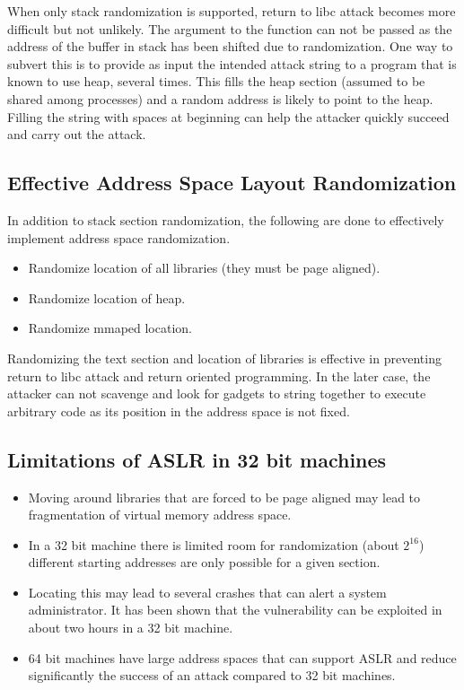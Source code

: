 \documentclass[11pt]{article} %
\begin{document}
When only stack randomization is supported, return to libc attack becomes more
difficult but not unlikely. The argument to the function can not be passed as
the address of the buffer in stack has been shifted due to randomization. One
way to subvert this is to provide as input the intended attack string to a
program that is known to use heap, several times. This fills the heap section
(assumed to be shared among processes) and a random address is likely to point
 to the heap. Filling the string with spaces at beginning can help the attacker
quickly succeed and carry out the attack.

\subsection {Effective Address Space Layout Randomization}
In addition to stack section randomization, the following are done to effectively
implement address space randomization.

\begin {itemize} \itemsep -2pt
\item Randomize location of all libraries (they must be page aligned).
\item Randomize location of heap.
\item Randomize mmaped location.
\end {itemize}

Randomizing the text section and location of libraries is effective in preventing
return to libc attack and return oriented programming. In the later case, the
attacker can not scavenge and look for gadgets to string together to execute
arbitrary code as its position in the address space is not fixed.

\subsection {Limitations of ASLR in 32 bit machines}
\begin {itemize} \itemsep -2pt
\item Moving around libraries that are forced to be page aligned may lead to
fragmentation of virtual memory address space.
\item In a 32 bit machine there is limited room for randomization (about $2^{16}$)
different starting addresses are only possible for a given section.
\item Locating this may lead to several crashes that can alert a system
administrator. It has been shown that the vulnerability can be exploited in
about two hours in a 32 bit machine.
\item 64 bit machines have large address spaces that can support ASLR and reduce
significantly the success of an attack compared to 32 bit machines.
\end {itemize}
\end{document}
